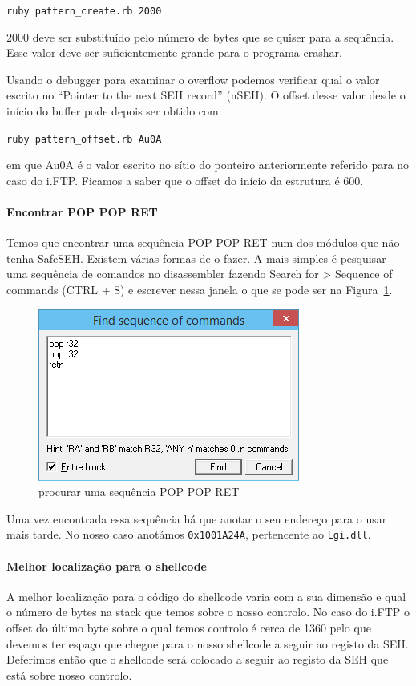 \documentclass[a4paper]{article}
\begin{document}
	\texttt{ruby pattern\_create.rb 2000}

2000 deve ser substituído pelo número de bytes que se quiser para a sequência. Esse valor deve ser suficientemente grande para o programa crashar.

Usando o debugger para examinar o overflow podemos verificar qual o valor escrito no ``Pointer to the next SEH record'' (nSEH). O offset desse valor desde o início do buffer pode depois ser obtido com:

	\texttt{ruby pattern\_offset.rb Au0A}

em que Au0A é o valor escrito no sítio do ponteiro anteriormente referido para no caso do i.FTP. Ficamos a saber que o offset do início da estrutura é 600.

\paragraph*{Encontrar POP POP RET} Temos que encontrar uma sequência POP POP RET num dos módulos que não tenha SafeSEH. Existem várias formas de o fazer. A mais simples é pesquisar uma sequência de comandos no disassembler fazendo Search for > Sequence of commands (CTRL + S) e escrever nessa janela o que se pode ser na Figura~\ref{find_POPPOPRET}.

\begin{figure}
	\centering
	\includegraphics[scale=1]{find_POPPOPRET}
	\caption{procurar uma sequência POP POP RET}
	\label{find_POPPOPRET}
\end{figure}

Uma vez encontrada essa sequência há que anotar o seu endereço para o usar mais tarde. No nosso caso anotámos \texttt{0x1001A24A}, pertencente ao \texttt{Lgi.dll}.

\paragraph*{Melhor localização para o shellcode} A melhor localização para o código do shellcode varia com a sua dimensão e qual o número de bytes na stack que temos sobre o nosso controlo. No caso do i.FTP o offset do último byte sobre o qual temos controlo é cerca de 1360 pelo que devemos ter espaço que chegue para o nosso shellcode a seguir ao registo da SEH. Deferimos então que o shellcode será colocado a seguir ao registo da SEH que está sobre nosso controlo.
\end{document}
